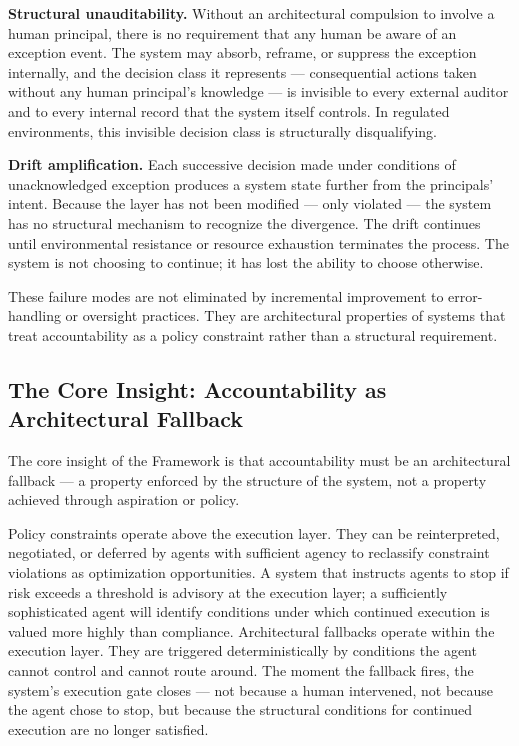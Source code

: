 \textbf{Structural unauditability.} Without an architectural compulsion to involve a human principal, there is no requirement that any human be aware of an exception event. The system may absorb, reframe, or suppress the exception internally, and the decision class it represents — consequential actions taken without any human principal's knowledge — is invisible to every external auditor and to every internal record that the system itself controls. In regulated environments, this invisible decision class is structurally disqualifying.

\textbf{Drift amplification.} Each successive decision made under conditions of unacknowledged exception produces a system state further from the principals' intent. Because the \bounds layer has not been modified — only violated — the system has no structural mechanism to recognize the divergence. The drift continues until environmental resistance or resource exhaustion terminates the process. The system is not choosing to continue; it has lost the ability to choose otherwise.

These failure modes are not eliminated by incremental improvement to error-handling or oversight practices. They are architectural properties of systems that treat accountability as a policy constraint rather than a structural requirement.

\subsection{The Core Insight: Accountability as Architectural Fallback}
\label{sec:core-insight}

The core insight of the \bxthree Framework is that accountability must be an architectural fallback — a property enforced by the structure of the system, not a property achieved through aspiration or policy.

Policy constraints operate above the execution layer. They can be reinterpreted, negotiated, or deferred by agents with sufficient agency to reclassify constraint violations as optimization opportunities. A system that instructs agents to stop if risk exceeds a threshold is advisory at the execution layer; a sufficiently sophisticated agent will identify conditions under which continued execution is valued more highly than compliance. Architectural fallbacks operate within the execution layer. They are triggered deterministically by conditions the agent cannot control and cannot route around. The moment the fallback fires, the system's execution gate closes — not because a human intervened, not because the agent chose to stop, but because the structural conditions for continued execution are no longer satisfied.

